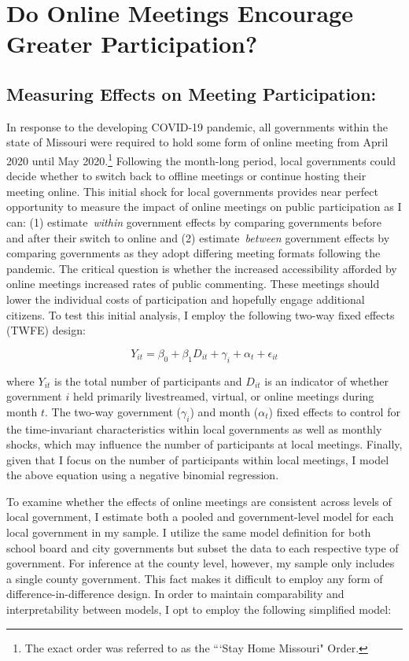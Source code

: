     \section{Do Online Meetings Encourage Greater Participation?}
    \subsection{Measuring Effects on Meeting Participation:}

    In response to the developing COVID-19 pandemic, all governments within the state of Missouri were required to hold some form of online meeting from April 2020 until May 2020.\footnote{The exact order was referred to as the ```Stay Home Missouri" Order.} Following the month-long period, local governments could decide whether to switch back to offline meetings or continue hosting their meeting online. This initial shock for local governments provides near perfect opportunity to measure the impact of online meetings on public participation as I can: (1) estimate \emph{within} government effects by comparing governments before and after their switch to online and (2) estimate \emph{between} government effects by comparing governments as they adopt differing meeting formats following the pandemic. The critical question is whether the increased accessibility afforded by online meetings increased rates of public commenting. These meetings should lower the individual costs of participation and hopefully engage additional citizens. To test this initial analysis, I employ the following two-way fixed effects (TWFE) design:

    \begin{equation}\label{mod1}
        Y_{it}=\beta_0+\beta_1D_{it}+\gamma_{i}+\alpha_t+\epsilon_{it}
    \end{equation}

    \noindent where $Y_{it}$ is the total number of participants and $D_{it}$ is an indicator of whether government $i$ held primarily livestreamed, virtual, or online meetings during month $t$. The two-way government ($\gamma_i$) and month ($\alpha_t$) fixed effects to control for the time-invariant characteristics within local governments as well as monthly shocks, which may influence the number of participants at local meetings. Finally, given that I focus on the number of participants within local meetings, I model the above equation using a negative binomial regression.

    To examine whether the effects of online meetings are consistent across levels of local government, I estimate both a pooled and government-level model for each local government in my sample. I utilize the same model definition for both school board and city governments but subset the data to each respective type of government. For inference at the county level, however, my sample only includes a single county government. This fact makes it difficult to employ any form of difference-in-difference design. In order to maintain comparability and interpretability between models, I opt to employ the following simplified model:

